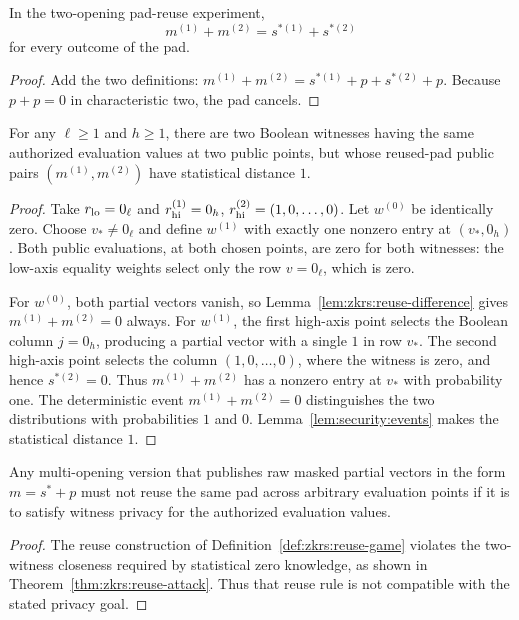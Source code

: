 \begin{lemma}\label{lem:zkrs:reuse-difference}
In the two-opening pad-reuse experiment,
\[
 \boxed{m^{(1)}+m^{(2)}
        =s^{*(1)}+s^{*(2)}}
\]
for every outcome of the pad.
\end{lemma}
\begin{proof}
Add the two definitions:
$m^{(1)}+m^{(2)}
=s^{*(1)}+p+s^{*(2)}+p$.
Because $p+p=0$ in characteristic
two, the pad cancels.
\end{proof}

\begin{theorem}\label{thm:zkrs:reuse-attack}
For any $\ell\geq1$ and $h\geq1$,
there are two Boolean witnesses having the
same authorized evaluation values at two
public points, but whose reused-pad
public pairs $(m^{(1)},m^{(2)})$
have statistical distance $1$.
\end{theorem}
\begin{proof}
Take $r_{\rm lo}=0_\ell$ and
$r_{\rm hi}^{(1)}=0_h$,
$r_{\rm hi}^{(2)}=(1,0,\ldots,0)$.
Let $w^{(0)}$ be identically zero.
Choose $v_*\neq0_\ell$ and define
$w^{(1)}$ with exactly one nonzero
entry at $(v_*,0_h)$.
Both public evaluations, at both
chosen points, are zero for both
witnesses: the low-axis equality
weights select only the row
$v=0_\ell$, which is zero.

For $w^{(0)}$, both partial vectors
vanish, so Lemma~\ref{lem:zkrs:reuse-difference}
gives $m^{(1)}+m^{(2)}=0$ always.
For $w^{(1)}$, the first high-axis
point selects the Boolean column
$j=0_h$, producing a partial vector
with a single $1$ in row $v_*$.
The second high-axis point selects
the column $(1,0,\ldots,0)$, where
the witness is zero, and hence
$s^{*(2)}=0$.
Thus $m^{(1)}+m^{(2)}$ has a nonzero
entry at $v_*$ with probability one.
The deterministic event
$m^{(1)}+m^{(2)}=0$ distinguishes the
two distributions with probabilities
$1$ and $0$.
Lemma~\ref{lem:security:events}
makes the statistical distance $1$.
\end{proof}

\begin{corollary}\label{cor:zkrs:fresh-pads}
Any multi-opening version that
publishes raw masked partial
vectors in the form $m=s^*+p$
must not reuse the same pad
across arbitrary evaluation points
if it is to satisfy witness privacy
for the authorized evaluation values.
\end{corollary}
\begin{proof}
The reuse construction of
Definition~\ref{def:zkrs:reuse-game}
violates the two-witness closeness
required by statistical zero
knowledge, as shown in
Theorem~\ref{thm:zkrs:reuse-attack}.
Thus that reuse rule is not
compatible with the stated
privacy goal.
\end{proof}

